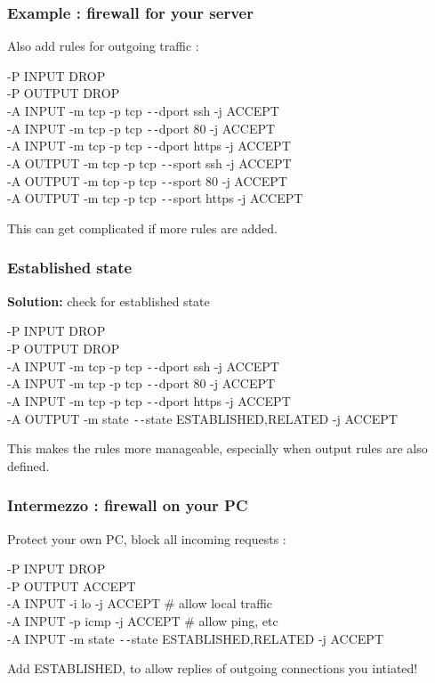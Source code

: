 \documentclass[14pt]{beamer}
\newcommand{\dd}{{\texttt{-{}-}}}
\begin{document}
  \begin{frame}
    \frametitle{Example : firewall for your server}
    Also add rules for outgoing traffic :
    \begin{example}
      \small{-P INPUT DROP\\
      -P OUTPUT DROP\\
      -A INPUT -m tcp -p tcp \dd dport ssh -j ACCEPT\\
      -A INPUT -m tcp -p tcp \dd dport 80 -j ACCEPT\\
      -A INPUT -m tcp -p tcp \dd dport https -j ACCEPT\\
      {\color{blue}-A OUTPUT -m tcp -p tcp \dd sport ssh -j ACCEPT\\
      -A OUTPUT -m tcp -p tcp \dd sport 80 -j ACCEPT\\
      -A OUTPUT -m tcp -p tcp \dd sport https -j ACCEPT}}
    \end{example}
    \pause
    This can get complicated if more rules are added.
  \end{frame}
  \begin{frame}
    \frametitle{Established state}
    \textbf{Solution:} check for established state
    \begin{example}
      \small{-P INPUT DROP\\
      -P OUTPUT DROP\\
      -A INPUT -m tcp -p tcp \dd dport ssh -j ACCEPT\\
      -A INPUT -m tcp -p tcp \dd dport 80 -j ACCEPT\\
      -A INPUT -m tcp -p tcp \dd dport https -j ACCEPT\\
      {\color{blue}-A OUTPUT -m state \dd state ESTABLISHED,RELATED -j ACCEPT}}
    \end{example}
    This makes the rules more manageable, especially when output rules are also defined.
  \end{frame}
  \begin{frame}
    \frametitle{Intermezzo : firewall on your PC}
    Protect your own PC, block all incoming requests :
    \begin{example}
      \small{-P INPUT DROP\\
      -P OUTPUT ACCEPT}\\
      \pause
      \small{-A INPUT -i lo -j ACCEPT \# allow local traffic\\
      -A INPUT -p icmp -j ACCEPT \# allow ping, etc\\
      -A INPUT -m state \dd state ESTABLISHED,RELATED -j ACCEPT}
    \end{example}
    Add ESTABLISHED, to allow replies of outgoing connections you intiated!
  \end{frame}
\end{document}
